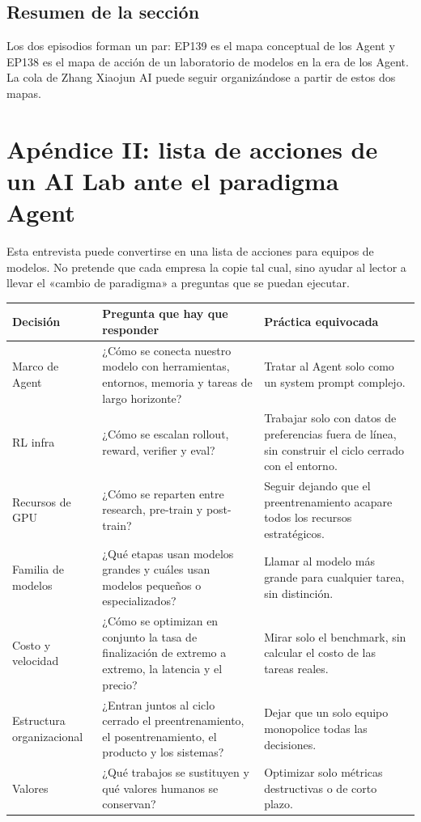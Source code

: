 \documentclass[a4paper]{article}
\begin{document}
\subsection{Resumen de la sección}

Los dos episodios forman un par: EP139 es el mapa conceptual de los Agent y EP138 es el mapa de acción de un laboratorio de modelos en la era de los Agent. La cola de Zhang Xiaojun AI puede seguir organizándose a partir de estos dos mapas.
\section{Apéndice II: lista de acciones de un AI Lab ante el paradigma Agent}

Esta entrevista puede convertirse en una lista de acciones para equipos de modelos. No pretende que cada empresa la copie tal cual, sino ayudar al lector a llevar el «cambio de paradigma» a preguntas que se puedan ejecutar.

\noindent\begin{longtable}{p{}p{}p{}}
\toprule
Decisión & Pregunta que hay que responder & Práctica equivocada \\
\midrule
Marco de Agent & ¿Cómo se conecta nuestro modelo con herramientas, entornos, memoria y tareas de largo horizonte? & Tratar al Agent solo como un system prompt complejo. \\
RL infra & ¿Cómo se escalan rollout, reward, verifier y eval? & Trabajar solo con datos de preferencias fuera de línea, sin construir el ciclo cerrado con el entorno. \\
Recursos de GPU & ¿Cómo se reparten entre research, pre-train y post-train? & Seguir dejando que el preentrenamiento acapare todos los recursos estratégicos. \\
Familia de modelos & ¿Qué etapas usan modelos grandes y cuáles usan modelos pequeños o especializados? & Llamar al modelo más grande para cualquier tarea, sin distinción. \\
Costo y velocidad & ¿Cómo se optimizan en conjunto la tasa de finalización de extremo a extremo, la latencia y el precio? & Mirar solo el benchmark, sin calcular el costo de las tareas reales. \\
Estructura organizacional & ¿Entran juntos al ciclo cerrado el preentrenamiento, el posentrenamiento, el producto y los sistemas? & Dejar que un solo equipo monopolice todas las decisiones. \\
Valores & ¿Qué trabajos se sustituyen y qué valores humanos se conservan? & Optimizar solo métricas destructivas o de corto plazo. \\
\bottomrule
\end{longtable}
\end{document}
